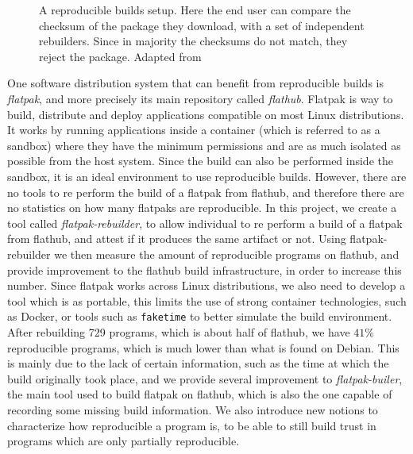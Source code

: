 \documentclass[a4paper,11pt,oneside]{report}
\theoremstyle{definition}
\newcommand{\sysname}{flatpak-rebuilder\xspace}
\newcommand{\rb}{reproducible builds\xspace}
\newcommand{\fp}{flatpak\xspace}
\newcommand{\Fp}{Flatpak\xspace}
\newcommand{\fh}{flathub\xspace}
\newcommand{\fb}{flatpak-builer\xspace}
\begin{document}
\begin{figure}[h]
    \caption{A reproducible builds setup. Here the end user can compare the
    checksum of the package they download, with a set of independent
    rebuilders. Since in majority the checksums do not match, they reject the
    package. Adapted from \cite{DBLP:journals/corr/abs-2104-06020}}
    \label{fig:reprobuild}
\end{figure}

One software distribution system that can benefit from \rb is \emph{\fp}, and
more precisely its main repository called \emph{\fh}. \Fp is way to build,
distribute and deploy applications compatible on most Linux distributions. It
works by running applications inside a container (which is referred to as a
sandbox) where they have the minimum permissions and are as much isolated as
possible from the host system. Since the build can also be performed inside the
sandbox, it is an ideal environment to use \rb. However, there are no tools to
re perform the build of a \fp from \fh, and therefore there are no statistics
on how many flatpaks are reproducible. In this project, we create a tool called
\emph{\sysname}, to allow individual to re perform a build of a \fp from \fh,
and attest if it produces the same artifact or not. Using \sysname we then
measure the amount of reproducible programs on \fh, and provide improvement to
the \fh build infrastructure, in order to increase this number. Since \fp works
across Linux distributions, we also need to develop a tool which is as
portable, this limits the use of strong container technologies, such as Docker,
or tools such as \verb|faketime| to better simulate the build environment.
After rebuilding 729 programs, which is about half of \fh, we have $41\%$
reproducible programs, which is much lower than what is found on Debian. This
is mainly due to the lack of certain information, such as the time at which
the build originally took place, and we provide several improvement to
\emph{\fb}, the main tool used to build \fp on \fh, which is also the one
capable of recording some missing build information. We also introduce
new notions to characterize how reproducible a program is, to be able to still
build trust in programs which are only partially reproducible.
\end{document}
